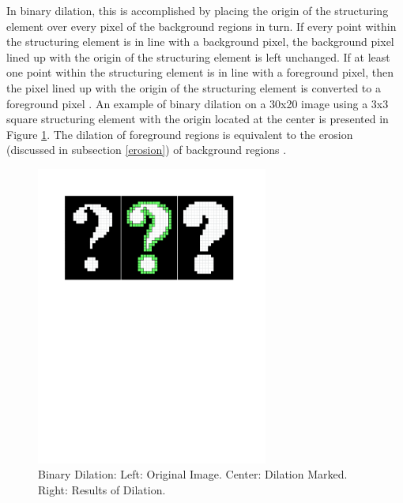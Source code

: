 \documentclass{sig-alternate}
\begin{document}
In binary dilation, this is accomplished by placing the origin of the structuring element over every pixel of the background regions in turn. If every point within the structuring element is in line with a background pixel, the background pixel lined up with the origin of the structuring element is left unchanged. If at least one point within the structuring element is in line with a foreground pixel, then the pixel lined up with the origin of the structuring element is converted to a foreground pixel \cite{MorphologyWiki}. An example of binary dilation on a 30x20 image using a 3x3 square structuring element with the origin located at the center is presented in Figure \ref{binary dilation figure}. The dilation of foreground regions is equivalent to the erosion (discussed in subsection \ref{erosion}) of background regions \cite{MorphologyWiki}.
\begin{figure}
\centering
\includegraphics[width=3in,trim={0 6.75in 0 0},clip]{dilation}
\caption{Binary Dilation: Left: Original Image. Center: Dilation Marked. Right: Results of Dilation.}
\label{binary dilation figure}
\end{figure}
\end{document}
